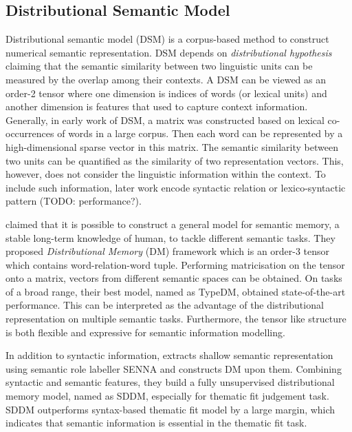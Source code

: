 \documentclass[a4paper]{article}
\begin{document}
\subsection{Distributional Semantic Model} \label{sec:dsm}
Distributional semantic model (DSM) is a corpus-based method to construct numerical semantic representation. DSM depends on \textit{distributional hypothesis} \citep{harris1954distributional, miller1991contextual} claiming that the semantic similarity between two linguistic units can be measured by the overlap among their contexts. A DSM can be viewed as an order-2 tensor where one dimension is indices of words (or lexical units) and another dimension is features that used to capture context information. Generally, in early work of DSM, a matrix was constructed based on lexical co-occurrences of words in a large corpus. Then each word can be represented by a high-dimensional sparse vector in this matrix. The semantic similarity between two units can be quantified as the similarity of two representation vectors. This, however, does not consider the linguistic information within the context. To include such information, later work encode syntactic relation or lexico-syntactic pattern \citep{pado2007integration, erk2008structured, rothenhausler2009unsupervised} (TODO: performance?). 

\citet{baroni2010distributional} claimed that it is possible to construct a general model for semantic memory, a stable long-term knowledge of human, to tackle different semantic tasks. They proposed \textit{Distributional Memory} (DM) framework which is an order-3 tensor which contains word-relation-word tuple. Performing matricisation on the tensor onto a matrix, vectors from different semantic spaces can be obtained. On tasks of a broad range, their best model, named as TypeDM, obtained state-of-the-art performance. This can be interpreted as the advantage of the distributional representation on multiple semantic tasks. Furthermore, the tensor like structure is both flexible and expressive for semantic information modelling. 

In addition to syntactic information, \citet{sayeed2014combining} extracts shallow semantic representation using semantic role labeller SENNA and constructs DM upon them. Combining syntactic and semantic features, they build a fully unsupervised distributional memory model, named as SDDM, especially for thematic fit judgement task. SDDM outperforms syntax-based thematic fit model by a large margin, which indicates that semantic information is essential in the thematic fit task. 
\end{document}
